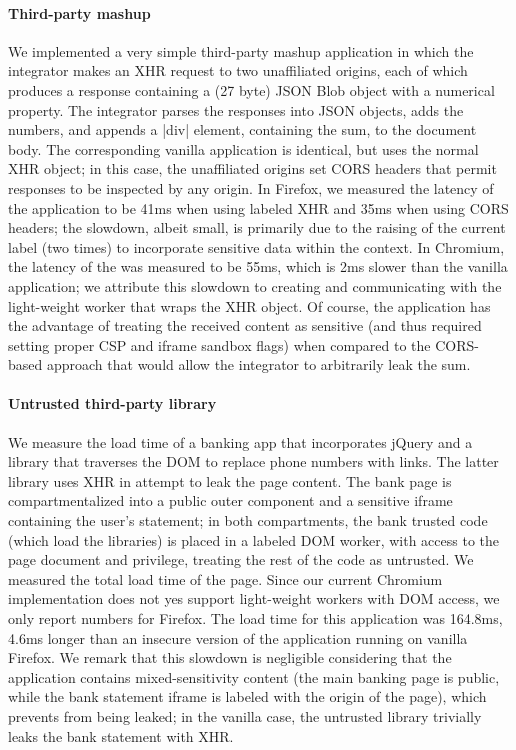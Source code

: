 \paragraph{Third-party mashup}

We implemented a very simple third-party mashup application in which
the integrator makes an XHR request to two unaffiliated origins, each
of which produces a response containing a (27 byte) JSON Blob
object with a numerical property.
%
The integrator parses the responses into JSON objects, adds the
numbers, and appends a \js|div| element, containing the sum, to the
document body.
%
The corresponding vanilla application is identical, but uses the
normal XHR object; in this case, the unaffiliated origins set CORS
headers that permit responses to be inspected by any origin.
%
In Firefox, we measured the latency of the application to be 41ms when
using labeled XHR and 35ms when using CORS headers; the slowdown,
albeit small, is primarily due to the raising of the current label
(two times) to incorporate sensitive data within the context.
%
In Chromium, the latency of the \sys{} was measured to be 55ms, 
which is 2ms slower than the vanilla application; we attribute this
slowdown to creating and communicating with the light-weight worker
that wraps the XHR object.
%
Of course, the \sys{} application has the advantage of treating the
received content as sensitive (and thus required setting proper CSP
and iframe sandbox flags) when compared to the CORS-based approach
that would allow the integrator to arbitrarily leak the sum.

\paragraph{Untrusted third-party library}

We measure the load time of a banking app that incorporates jQuery and
a library that traverses the DOM to replace phone numbers with links.
%
The latter library uses XHR in attempt to leak the page content.
%
The bank page is compartmentalized into a public outer component and
a sensitive iframe containing the user's statement;
in both compartments, the bank trusted code (which load the libraries)
is placed in a labeled DOM worker, with access to the page document
and privilege, treating the rest of the code as untrusted.
%
We measured the total load time of the page.
%
Since our current Chromium implementation does not yes support
light-weight workers with DOM access, we only report numbers for
Firefox.
%
The load time for this application was 164.8ms, 4.6ms longer than an
insecure version of the application running on vanilla Firefox.
%
%
We remark that this slowdown is negligible considering that the
application contains mixed-sensitivity content (the main banking page
is public, while the bank statement iframe is labeled with the origin
of the page), which \sys{} prevents from being leaked; in the vanilla
case, the untrusted library trivially leaks the bank statement with
XHR.

